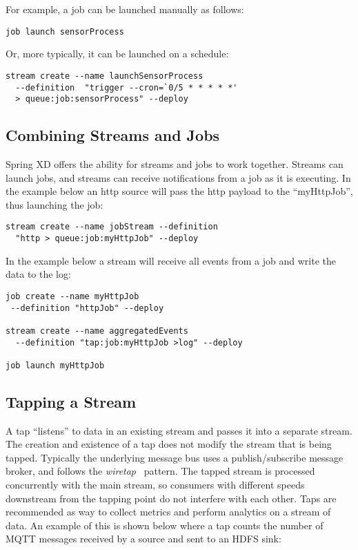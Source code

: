 For example, a job can be launched manually as follows:

\begin{lstlisting}
job launch sensorProcess
\end{lstlisting}

Or, more typically, it can be launched on a schedule:

\begin{lstlisting}
stream create --name launchSensorProcess
  --definition  "trigger --cron=`0/5 * * * * *'
  > queue:job:sensorProcess" --deploy
\end{lstlisting}

\subsection {Combining Streams and Jobs}

Spring XD offers the ability for streams and jobs to work together. Streams
can launch jobs, and streams can receive notifications from a job
as it is executing.  In the example below an http source will pass the http
payload to the ``myHttpJob'', thus launching the job:

\begin{lstlisting}
stream create --name jobStream --definition
  "http > queue:job:myHttpJob" --deploy
\end{lstlisting}

In the example below a stream will receive all events from a job and write
the data to the log:

\begin{lstlisting}
job create --name myHttpJob
 --definition "httpJob" --deploy

stream create --name aggregatedEvents
  --definition "tap:job:myHttpJob >log" --deploy

job launch myHttpJob
\end{lstlisting}

\subsection {Tapping a Stream} \label{sssec:deploytap}

A tap ``listens'' to data in an existing stream and passes it into a separate
stream. The creation and existence of a tap does not modify the stream that
is being tapped. Typically the underlying message bus uses a publish/subscribe
message broker, and follows the \emph{wiretap}~\cite{wiretap}
pattern. The tapped stream is processed concurrently with the main stream, so
 consumers with different speeds downstream from the tapping point do not
 interfere with each other. Taps are recommended as way to collect metrics and perform
analytics on a stream of data. An example of this is shown below where a
tap counts the number of MQTT messages received by a source and sent to an
HDFS sink:

